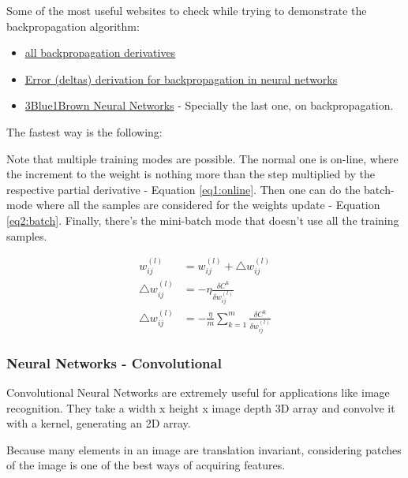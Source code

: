 Some of the most useful websites to check while trying to demonstrate the backpropagation algorithm:
\begin{itemize}
    \item \href{https://medium.com/@pdquant/all-the-backpropagation-derivatives-d5275f727f60}{\ul{all backpropagation derivatives}}
    \item \href{https://stats.stackexchange.com/questions/94387/how-to-derive-errors-in-neural-network-with-the-backpropagation-algorithm}{\ul{Error (deltas) derivation for backpropagation in neural networks}}
    \item \href{https://www.youtube.com/playlist?list=PLZHQObOWTQDNU6R1_67000Dx_ZCJB-3pi}{3Blue1Brown Neural Networks} - Specially the last one, on backpropagation.
\end{itemize}

The fastest way is the following:



Note that multiple training modes are possible. The normal one is on-line, where the increment to the weight is nothing more than the step multiplied by the respective partial derivative - Equation \eqref{eq1:online}. Then one can do the batch-mode where all the samples are considered for the weights update - Equation \eqref{eq2:batch}. Finally, there's the mini-batch mode that doesn't use all the training samples.

\begin{align}
    w_{ij}^{(l)} &= w_{ij}^{(l)} + \bigtriangleup w_{ij}^{(l)} \\
    \bigtriangleup w_{ij}^{(l)} &= -\eta \frac{\delta C^k}{\delta w_{ij}^{(l)}} \label{eq1:online} \\
    \bigtriangleup w_{ij}^{(l)} &= -\frac{\eta}{m} \sum_{k=1}^m  \frac{\delta C^k}{\delta w_{ij}^{(l)}} \label{eq2:batch}
\end{align}



\subsubsection{Neural Networks - Convolutional} 

Convolutional Neural Networks are extremely useful for applications like image recognition. They take a width x height x image depth 3D array and convolve it with a kernel, generating an 2D array. 

Because many elements in an image are translation invariant, considering patches of the image is one of the best ways of acquiring features.

